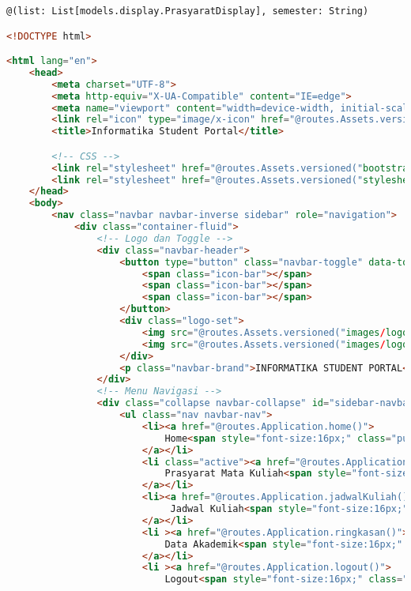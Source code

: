 \singlespacing 
\begin{lstlisting}[language=html,basicstyle=\tiny,caption=prasyarat.scala.html]
@(list: List[models.display.PrasyaratDisplay], semester: String)

<!DOCTYPE html>

<html lang="en">
    <head>
        <meta charset="UTF-8">
		<meta http-equiv="X-UA-Compatible" content="IE=edge">
        <meta name="viewport" content="width=device-width, initial-scale=1">
        <link rel="icon" type="image/x-icon" href="@routes.Assets.versioned("images/logo-IT.png")" />
		<title>Informatika Student Portal</title>

		<!-- CSS -->
        <link rel="stylesheet" href="@routes.Assets.versioned("bootstrap/css/bootstrap.min.css")">
        <link rel="stylesheet" href="@routes.Assets.versioned("stylesheets/main.css")"> 
    </head>
    <body>
		<nav class="navbar navbar-inverse sidebar" role="navigation">
			<div class="container-fluid">
				<!-- Logo dan Toggle -->
				<div class="navbar-header">
					<button type="button" class="navbar-toggle" data-toggle="collapse" data-target="#sidebar-navbar-collapse">
						<span class="icon-bar"></span>
						<span class="icon-bar"></span>
						<span class="icon-bar"></span>
					</button>
					<div class="logo-set">
						<img src="@routes.Assets.versioned("images/logo-unpar.png")" width="25%" height="25%"/>
						<img src="@routes.Assets.versioned("images/logo-IT.png")" width="25%" height="25%"/>
					</div>
					<p class="navbar-brand">INFORMATIKA STUDENT PORTAL</p>
				</div>
				<!-- Menu Navigasi -->
				<div class="collapse navbar-collapse" id="sidebar-navbar-collapse">
					<ul class="nav navbar-nav">
						<li><a href="@routes.Application.home()">
							Home<span style="font-size:16px;" class="pull-right hidden-xs showopacity glyphicon glyphicon-home"></span>
						</a></li>
						<li class="active"><a href="@routes.Application.prasyarat()">
							Prasyarat Mata Kuliah<span style="font-size:16px;" class="pull-right hidden-xs showopacity glyphicon glyphicon-tasks"></span>
						</a></li>
						<li><a href="@routes.Application.jadwalKuliah()">
							 Jadwal Kuliah<span style="font-size:16px;" class="pull-right hidden-xs showopacity glyphicon glyphicon-calendar"></span>
						</a></li>
						<li ><a href="@routes.Application.ringkasan()">
							Data Akademik<span style="font-size:16px;" class="pull-right hidden-xs showopacity glyphicon glyphicon-book"></span>
						</a></li>
						<li ><a href="@routes.Application.logout()">
							Logout<span style="font-size:16px;" class="pull-right hidden-xs showopacity glyphicon glyphicon-log-out"></span>

\end{lstlisting}
